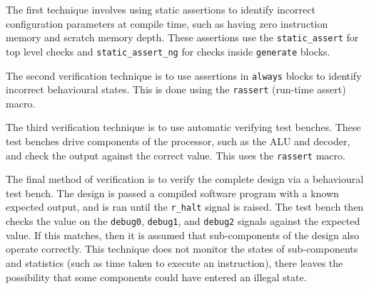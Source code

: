 The first technique involves using static assertions to identify incorrect configuration parameters at compile time, such as having zero instruction memory and scratch memory depth. These assertions use the \verb|static_assert| for top level checks and \verb|static_assert_ng| for checks inside \verb|generate| blocks.

The second verification technique is to use assertions in \verb|always| blocks to identify incorrect behavioural states. This is done using the \verb|rassert| (run-time assert) macro.

The third verification technique is to use automatic verifying test benches. These test benches drive components of the processor, such as the ALU and decoder, and check the output against the correct value. This uses the \verb|rassert| macro.

The final method of verification is to verify the complete design via a behavioural test bench. The design is passed a compiled software program with a known expected output, and is ran until the \verb|r_halt| signal is raised. The test bench then checks the value on the \verb|debug0|, \verb|debug1|, and \verb|debug2| signals against the expected value. If this matches, then it is assumed that sub-components of the design also operate correctly. This technique does not monitor the states of sub-components and statistics (such as time taken to execute an instruction), there leaves the possibility that some components could have entered an illegal state.





